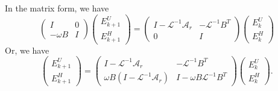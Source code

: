 In the matrix form, we have 
\begin{equation}
\begin{pmatrix} 
I  & 0 \\
-\omega B & I
\end{pmatrix} 
\begin{pmatrix} 
E^U_{k+1} \\
E^H_{k+1}
\end{pmatrix}  = 
\begin{pmatrix} 
I - \mathcal{L}^{-1} \mathcal{A}_r & - \mathcal{L}^{-1} B^T \\
0 & I
\end{pmatrix} 
\begin{pmatrix} 
E^U_{k} \\
E^H_{k}
\end{pmatrix} 
\end{equation}
Or, we have 
\begin{equation}
\begin{pmatrix} 
E^U_{k+1} \\
E^H_{k+1}
\end{pmatrix}  = 
\begin{pmatrix} 
I - \mathcal{L}^{-1} \mathcal{A}_r & - \mathcal{L}^{-1} B^T \\
\omega B (I - \mathcal{L}^{-1} \mathcal{A}_r) & I - \omega B \mathcal{L}^{-1} B^T
\end{pmatrix} 
\begin{pmatrix} 
E^U_{k} \\
E^H_{k}
\end{pmatrix}.  
\end{equation}

